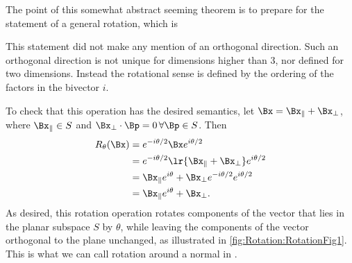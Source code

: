 
The point of this somewhat abstract seeming theorem is to prepare for the statement of a general  rotation, which is

This statement did not make any mention of an orthogonal direction.
Such an orthogonal direction is not unique for dimensions higher than 3, nor defined for two dimensions.
Instead the rotational sense is defined by the ordering of the factors in the bivector \( i \).

To check that this operation has the desired semantics,
let \( \Bx = \Bx_\parallel + \Bx_\perp \), where \( \Bx_\parallel \in S \) and \( \Bx_\perp \cdot \Bp = 0 \,\forall \Bp \in S \).
Then
\begin{equation}\label{eqn:generalRotation:1880}
\begin{aligned}
R_\theta(\Bx)
&= e^{ - i \theta/2 } \Bx e^{ i\theta/2 } \\
&= e^{ - i \theta/2 } \lr{ \Bx_\parallel + \Bx_\perp } e^{ i\theta/2 } \\
&= \Bx_\parallel e^{ i\theta } + \Bx_\perp e^{ - i \theta/2 } e^{ i\theta/2 } \\
&= \Bx_\parallel e^{ i\theta } + \Bx_\perp.
\end{aligned}
\end{equation}
As desired, this rotation operation rotates components of the vector that lies in the planar subspace \( S \) by \( \theta \), while leaving the components of the vector orthogonal to the plane unchanged, as illustrated in \cref{fig:Rotation:RotationFig1}.
This is what we can call rotation around a normal in .

